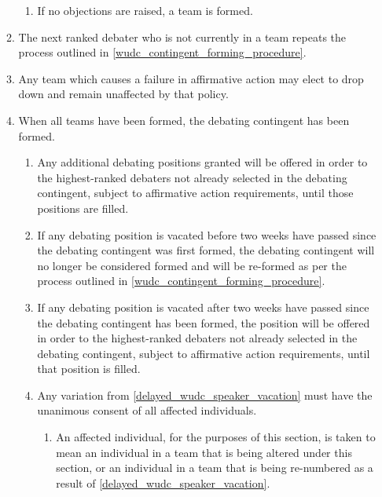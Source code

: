 \begin{enumerate}
\begin{enumerate}
\begin{enumerate}
    \item If no objections are raised, a team is formed.
    \end{enumerate}
  \item The next ranked debater who is not currently in a team repeats the process outlined in \ref{wudc_contingent_forming_procedure}.
  \item Any team which causes a failure in affirmative action may elect to drop down and remain unaffected by that policy.
  \item When all teams have been formed, the debating contingent has been formed.
    \begin{enumerate}
    \item Any additional debating positions granted will be offered in order to the highest-ranked debaters not already selected in the debating contingent, subject to affirmative action requirements, until those positions are filled.
    \item If any debating position is vacated before two weeks have passed since the debating contingent was first formed, the debating contingent will no longer be considered formed and will be re-formed as per the process outlined in \ref{wudc_contingent_forming_procedure}.
    \item If any debating position is vacated after two weeks have passed since the debating contingent has been formed, the position will be offered in order to the highest-ranked debaters not already selected in the debating contingent, subject to affirmative action requirements, until that position is filled. \label{delayed_wudc_speaker_vacation}
    \item Any variation from \ref{delayed_wudc_speaker_vacation} must have the unanimous consent of all affected individuals.
      \begin{enumerate}
      \item An affected individual, for the purposes of this section, is taken to mean an individual in a team that is being altered under this section, or an individual in a team that is being re-numbered as a result of \ref{delayed_wudc_speaker_vacation}.
      \end{enumerate}
    \end{enumerate}
  \end{enumerate}


\end{enumerate}
